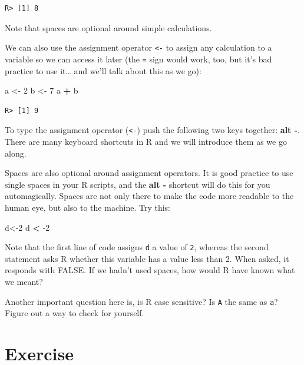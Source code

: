 \documentclass[
]{book}
\newenvironment{Shaded}{\begin{snugshade}}{\end{snugshade}}
\newcommand{\DecValTok}[1]{\textcolor[rgb]{0.00,0.00,0.81}{#1}}
\newcommand{\NormalTok}[1]{#1}
\newcommand{\OperatorTok}[1]{\textcolor[rgb]{0.81,0.36,0.00}{\textbf{#1}}}
\newcommand{\StringTok}[1]{\textcolor[rgb]{0.31,0.60,0.02}{#1}}
\begin{document}
\begin{verbatim}
R> [1] 8
\end{verbatim}

Note that spaces are optional around simple calculations.

We can also use the assignment operator \texttt{\textless{}-} to assign any calculation to a variable so we can access it later (the \texttt{=} sign would work, too, but it's bad practice to use it\ldots{} and we'll talk about this as we go):

\begin{Shaded}
\begin{Highlighting}[]
\NormalTok{a <{-}}\StringTok{ }\DecValTok{2}
\NormalTok{b <{-}}\StringTok{ }\DecValTok{7}
\NormalTok{a }\OperatorTok{+}\StringTok{ }\NormalTok{b}
\end{Highlighting}
\end{Shaded}

\begin{verbatim}
R> [1] 9
\end{verbatim}

To type the assignment operator (\texttt{\textless{}-}) push the following two keys together: \textbf{alt -}. There are many keyboard shortcuts in R and we will introduce them as we go along.

Spaces are also optional around assignment operators. It is good practice to use single spaces in your R scripts, and the \textbf{alt -} shortcut will do this for you automagically. Spaces are not only there to make the code more readable to the human eye, but also to the machine. Try this:

\begin{Shaded}
\begin{Highlighting}[]
\NormalTok{d<{-}}\DecValTok{2}
\NormalTok{d }\OperatorTok{<}\StringTok{ }\DecValTok{{-}2}
\end{Highlighting}
\end{Shaded}

Note that the first line of code assigns \texttt{d} a value of \texttt{2}, whereas the second statement asks R whether this variable has a value less than 2. When asked, it responds with FALSE. If we hadn't used spaces, how would R have known what we meant?

Another important question here is, is R case sensitive? Is \texttt{A} the same as \texttt{a}? Figure out a way to check for yourself.

\hypertarget{exercise}{%
\section{Exercise}\label{exercise}}
\end{document}
